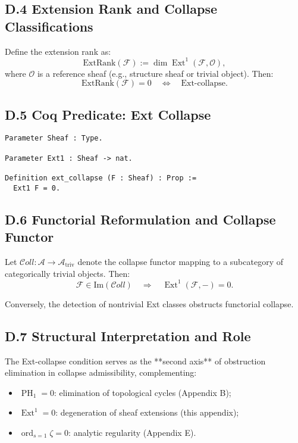 \documentclass[11pt]{article}
\DeclareMathOperator{\Ext}{Ext}
\DeclareMathOperator{\PH}{PH}
\newcommand{\ord}{\operatorname{ord}}
\begin{document}
\subsection*{D.4 Extension Rank and Collapse Classifications}

Define the extension rank as:
\[
\mathrm{ExtRank}(\mathcal{F}) := \dim \Ext^1(\mathcal{F}, \mathcal{O}),
\]
where \( \mathcal{O} \) is a reference sheaf (e.g., structure sheaf or trivial object). Then:
\[
\mathrm{ExtRank}(\mathcal{F}) = 0 \quad \Longleftrightarrow \quad \text{Ext-collapse}.
\]

\subsection*{D.5 Coq Predicate: Ext Collapse}
\begin{lstlisting}[language=Coq]
Parameter Sheaf : Type.

Parameter Ext1 : Sheaf -> nat.

Definition ext_collapse (F : Sheaf) : Prop :=
  Ext1 F = 0.
\end{lstlisting}

\subsection*{D.6 Functorial Reformulation and Collapse Functor}

Let \( \mathcal{C}oll: \mathcal{A} \rightarrow \mathcal{A}_{\mathrm{triv}} \) denote the collapse functor mapping to a subcategory of categorically trivial objects. Then:
\[
\mathcal{F} \in \mathrm{Im}(\mathcal{C}oll) \quad \Longrightarrow \quad \Ext^1(\mathcal{F}, -) = 0.
\]

Conversely, the detection of nontrivial Ext classes obstructs functorial collapse.

\subsection*{D.7 Structural Interpretation and Role}

The Ext-collapse condition serves as the **second axis** of obstruction elimination in collapse admissibility, complementing:
\begin{itemize}
  \item \( \PH_1 = 0 \): elimination of topological cycles (Appendix B);
  \item \( \Ext^1 = 0 \): degeneration of sheaf extensions (this appendix);
  \item \( \ord_{s=1} \zeta = 0 \): analytic regularity (Appendix E).
\end{itemize}
\end{document}
